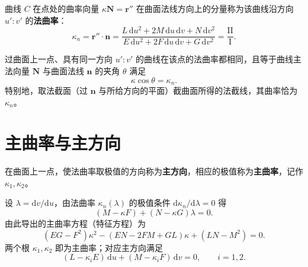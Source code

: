 \begin{definition}[法曲率]
	曲线 $C$ 在点处的曲率向量 $\kappa\mathbf{N}=\boldsymbol{r}''$ 在曲面法线方向上的分量称为该曲线沿方向 $u':v'$ 的\textbf{法曲率}：
	\begin{equation}
		\kappa_{n}=\boldsymbol{r}''\cdot\mathbf{n}
		=\frac{L\,\mathrm{d}u^{2}+2M\,\mathrm{d}u\,\mathrm{d}v+N\,\mathrm{d}v^{2}}
		{E\,\mathrm{d}u^{2}+2F\,\mathrm{d}u\,\mathrm{d}v+G\,\mathrm{d}v^{2}}
		=\frac{\mathrm{II}}{\mathrm{I}}.
		\label{eq:法曲率:定义}
	\end{equation}
\end{definition}

\begin{theorem}[Meusnier 定理]
	过曲面上一点、具有同一方向 $u':v'$ 的曲线在该点的法曲率都相同，且等于曲线主法向量 $\mathbf{N}$ 与曲面法线 $\mathbf{n}$ 的夹角 $\theta$ 满足
	\begin{equation}
		\kappa\cos\theta=\kappa_{n}.
		\label{eq:Meusnier:定理}
	\end{equation}
	特别地，取法截面（过 $\mathbf{n}$ 与所给方向的平面）截曲面所得的法截线，其曲率恰为 $\kappa_{n}$。
\end{theorem}

\section{主曲率与主方向}

\begin{definition}[主方向与主曲率]
	在曲面上一点，使法曲率取极值的方向称为\textbf{主方向}，相应的极值称为\textbf{主曲率}，记作 $\kappa_1,\kappa_2$。
\end{definition}

\begin{proposition}[主曲率方程]
	设 $\lambda=\mathrm{d}v/\mathrm{d}u$，由法曲率 $\kappa_n(\lambda)$ 的极值条件 $\mathrm{d}\kappa_n/\mathrm{d}\lambda=0$ 得
	\begin{equation}
		(M-\kappa F)+(N-\kappa G)\lambda=0.
		\label{eq:主方向:方程}
	\end{equation}
	由此导出的主曲率方程（特征方程）为
	\begin{equation}
		(EG-F^{2})\kappa^{2}-(EN-2FM+GL)\kappa+(LN-M^{2})=0.
		\label{eq:主曲率:特征方程}
	\end{equation}
	两个根 $\kappa_1,\kappa_2$ 即为主曲率；对应主方向满足
	\begin{equation}
		(L-\kappa_i E)\,\mathrm{d}u+(M-\kappa_i F)\,\mathrm{d}v=0,\qquad i=1,2.
		\label{eq:主方向:极值条件}
	\end{equation}
\end{proposition}

